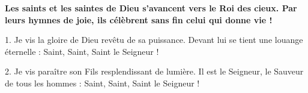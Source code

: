\textbf{
Les saints et les saintes de Dieu
s'avancent vers le Roi des cieux.
Par leurs hymnes de joie,
ils célèbrent sans fin celui qui donne vie !
}

1.
Je vis la gloire de Dieu revêtu de sa puissance.
Devant lui se tient une louange éternelle :
Saint, Saint, Saint le Seigneur !

2.
Je vis paraître son Fils resplendissant de lumière.
Il est le Seigneur, le Sauveur de tous les hommes :
Saint, Saint, Saint le Seigneur !

